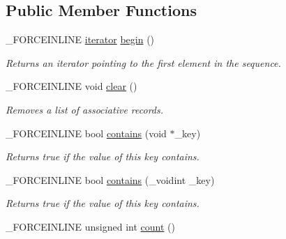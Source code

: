 \subsection*{Public Member Functions}
\begin{DoxyCompactItemize}
\item 
\hypertarget{classbt_1_1_map_void_a31e5dfe21d0d733eb6f5cb2872b0241b}{\-\_\-\-F\-O\-R\-C\-E\-I\-N\-L\-I\-N\-E \hyperlink{classbt_1_1_map_void_1_1iterator}{iterator} \hyperlink{classbt_1_1_map_void_a31e5dfe21d0d733eb6f5cb2872b0241b}{begin} ()}\label{classbt_1_1_map_void_a31e5dfe21d0d733eb6f5cb2872b0241b}

\begin{DoxyCompactList}\small\item\em Returns an iterator pointing to the first element in the sequence. \end{DoxyCompactList}\item 
\hypertarget{classbt_1_1_map_void_aac5cd5a0d177054424a3f577406cee8f}{\-\_\-\-F\-O\-R\-C\-E\-I\-N\-L\-I\-N\-E void \hyperlink{classbt_1_1_map_void_aac5cd5a0d177054424a3f577406cee8f}{clear} ()}\label{classbt_1_1_map_void_aac5cd5a0d177054424a3f577406cee8f}

\begin{DoxyCompactList}\small\item\em Removes a list of associative records. \end{DoxyCompactList}\item 
\hypertarget{classbt_1_1_map_void_ad6e36479f85c9e576c0f1ef49ada2572}{\-\_\-\-F\-O\-R\-C\-E\-I\-N\-L\-I\-N\-E bool \hyperlink{classbt_1_1_map_void_ad6e36479f85c9e576c0f1ef49ada2572}{contains} (void $\ast$\-\_\-key)}\label{classbt_1_1_map_void_ad6e36479f85c9e576c0f1ef49ada2572}

\begin{DoxyCompactList}\small\item\em Returns true if the value of this key contains. \end{DoxyCompactList}\item 
\hypertarget{classbt_1_1_map_void_a4c816fef1ce47ce165c3d2baa9571880}{\-\_\-\-F\-O\-R\-C\-E\-I\-N\-L\-I\-N\-E bool \hyperlink{classbt_1_1_map_void_a4c816fef1ce47ce165c3d2baa9571880}{contains} (\-\_\-voidint \-\_\-key)}\label{classbt_1_1_map_void_a4c816fef1ce47ce165c3d2baa9571880}

\begin{DoxyCompactList}\small\item\em Returns true if the value of this key contains. \end{DoxyCompactList}\item 
\hypertarget{classbt_1_1_map_void_a2e228d7b39827a5e35a04dfb16e0228d}{\-\_\-\-F\-O\-R\-C\-E\-I\-N\-L\-I\-N\-E unsigned int \hyperlink{classbt_1_1_map_void_a2e228d7b39827a5e35a04dfb16e0228d}{count} ()}\label{classbt_1_1_map_void_a2e228d7b39827a5e35a04dfb16e0228d}


\end{DoxyCompactItemize}
